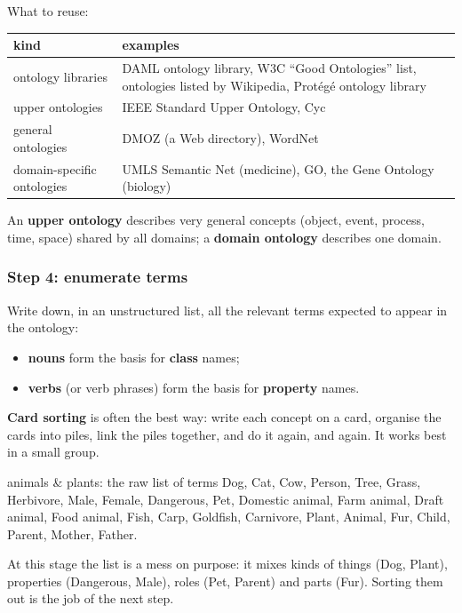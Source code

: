 What to reuse:
\begin{center}
\small
\begin{tabularx}{\linewidth}{@{}l X@{}}
\toprule
\textbf{kind} & \textbf{examples} \\
\midrule
ontology libraries & DAML ontology library, W3C ``Good Ontologies'' list, ontologies
  listed by Wikipedia, Protégé ontology library \\
upper ontologies & IEEE Standard Upper Ontology, Cyc \\
general ontologies & DMOZ (a Web directory), WordNet \\
domain-specific ontologies & UMLS Semantic Net (medicine), GO, the Gene Ontology
  (biology) \\
\bottomrule
\end{tabularx}
\end{center}
An \textbf{upper ontology} describes very general concepts (object, event, process,
time, space) shared by all domains; a \textbf{domain ontology} describes one domain.

\subsubsection{Step 4: enumerate terms}

Write down, in an unstructured list, all the relevant terms expected to appear in the
ontology:
\begin{itemize}[nosep]
  \item \textbf{nouns} form the basis for \textbf{class} names;
  \item \textbf{verbs} (or verb phrases) form the basis for \textbf{property} names.
\end{itemize}
\textbf{Card sorting} is often the best way: write each concept on a card, organise the
cards into piles, link the piles together, and do it again, and again. It works best in
a small group.

\begin{nbexample}{animals \& plants: the raw list of terms}
Dog, Cat, Cow, Person, Tree, Grass, Herbivore, Male, Female, Dangerous, Pet, Domestic
animal, Farm animal, Draft animal, Food animal, Fish, Carp, Goldfish, Carnivore, Plant,
Animal, Fur, Child, Parent, Mother, Father.

At this stage the list is a mess on purpose: it mixes kinds of things (Dog, Plant),
properties (Dangerous, Male), roles (Pet, Parent) and parts (Fur). Sorting them out is
the job of the next step.
\end{nbexample}

